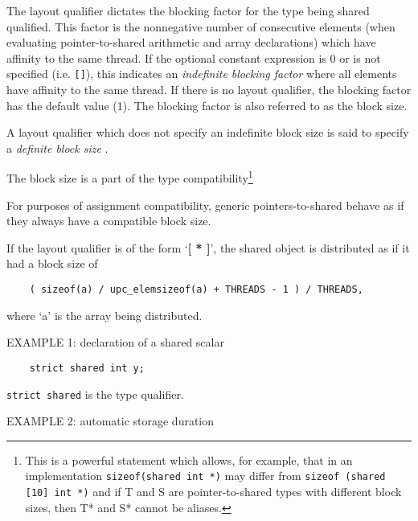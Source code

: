 \np The layout qualifier dictates the blocking factor for
    the type being shared qualified. This factor is the nonnegative
    number of consecutive elements (when evaluating pointer-to-shared
    arithmetic and array declarations) which have affinity to the
    same thread. If the optional constant expression is 0 or is not
    specified (i.e. {\tt[]}), this indicates an {\em indefinite blocking factor}
    where all elements have affinity to the same thread.  If there
    is no layout qualifier, the blocking factor has the default value
    (1). The blocking factor is also referred to as the block size.

\np A layout qualifier which does not specify an indefinite
    block size is said to specify a {\em definite block size} .

\np The block size is a part of the type
    compatibility\footnote{This is a powerful statement which allows,
    for example, that in an implementation {\tt sizeof(shared int *)}
    may differ from {\tt sizeof (shared [10] int *)} and if T and S
    are pointer-to-shared types with different block sizes, then T* and S*
    cannot be aliases.}

\np For purposes of assignment compatibility, generic pointers-to-shared
    behave as if they always have a compatible block size.
        
\np If the layout qualifier is of the form `{\bf [ * ]}',
    the shared object is distributed as if it had a block size of

\begin{verbatim}
    ( sizeof(a) / upc_elemsizeof(a) + THREADS - 1 ) / THREADS, 
\end{verbatim}

    where `a' is the array being distributed. 

\np EXAMPLE 1: declaration of a shared scalar 

\begin{verbatim}
    strict shared int y;
\end{verbatim}

    {\tt strict shared} is the type qualifier.

\np EXAMPLE 2: automatic storage duration 

